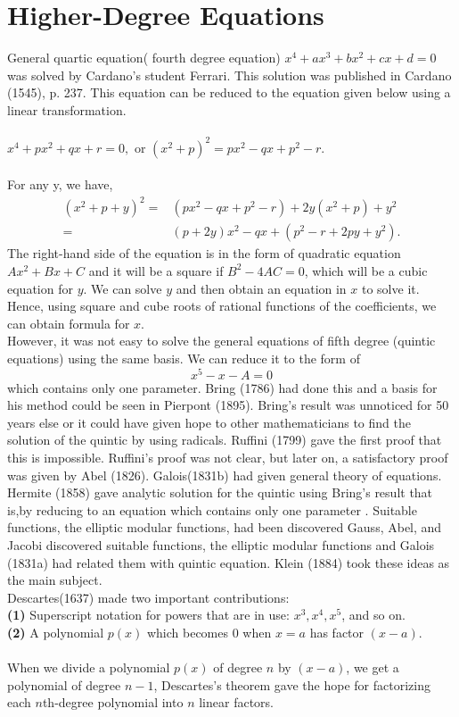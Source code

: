 \documentclass[a4paper,reqno,11pt]{amsart}
\theoremstyle{plain}%
\theoremstyle{definition}
\theoremstyle{remark}
\begin{document}
\section{Higher-Degree Equations}
General quartic equation( fourth degree equation)
$x^4 + ax^3 + bx^2 + cx + d = 0$
was solved by Cardano’s student Ferrari. This solution was published
in Cardano (1545), p. 237. This equation can be reduced to the equation given below using a linear transformation.\\
\\
$x^4 + px^2 + qx + r = 0,$  or  $(x^2+p)^2 = px^2 - qx + p^2 - r.$\\
\\
For any y, we have,
\begin{align*}
(x^2 + p + y)^2 =& (px^2 − qx + p^2 − r) + 2y(x^2 + p) + y^2\\
=& (p + 2y)x^2 − qx + (p^2 − r + 2py + y^2).
\end{align*}
The right-hand side of the equation is in the form of quadratic equation $Ax^2 + Bx + C$ and it will be a square if $B^2 - 4AC = 0$, which will be a cubic equation for $y$. We can solve $y$ and then obtain an equation in $x$ to solve it. Hence, using square and cube roots of rational functions of the coefficients, we can obtain formula for $x$.\\
\indent However, it was not easy to solve the general equations of fifth degree (quintic equations) using the same basis. We can reduce it to the form of
$$x^5 - x - A = 0$$
which contains only one parameter. Bring (1786) had done this and a basis for
his method could be seen in Pierpont (1895). Bring’s result was unnoticed for 50 years else  or it could have given hope to other mathematicians to find the solution of the quintic by using radicals.
Ruffini (1799) gave the first proof that this is impossible. Ruffini’s proof
was not clear, but later on, a satisfactory proof was given by Abel (1826). Galois(1831b) had given general theory of equations.\\
\indent Hermite (1858) gave analytic solution for the quintic using Bring's result that is,by reducing to an equation which contains only one parameter . Suitable functions, the elliptic modular functions, had been discovered Gauss, Abel, and Jacobi discovered suitable functions, the elliptic modular functions and Galois (1831a) had related them with quintic equation. Klein (1884) took these ideas as the main subject.\\
\indent Descartes(1637) made two important contributions:\\
\textbf{(1)} Superscript notation for powers that are in use: $x^3, x^4, x^5$, and so on.\\ \textbf{(2)} A polynomial $p(x)$ which becomes 0 when $x = a$ has factor $(x - a)$.\\
\\When we divide a polynomial $p(x)$ of degree $n$ by $(x - a)$, we get a polynomial of degree $n-1$, Descartes’s theorem gave the hope for
factorizing each $n$th-degree polynomial into $n$ linear factors.\\
\\
\end{document}
